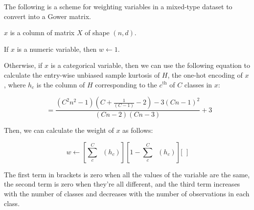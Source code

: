 \documentclass[11pt]{article}
\DeclareMathOperator{\Var}{\widehat{Var}}
\DeclareMathOperator{\Kurt}{\widehat{Kurtosis}}
\begin{document}
    The following is a scheme for weighting variables in a mixed-type dataset to convert into a Gower
    matrix.

    $x$ is a column of matrix $X$ of shape $\left(n,d\right)$.

    If $x$ is a numeric variable, then $w\leftarrow1$.

    Otherwise, if $x$ is a categorical variable, then we can use the following equation to calculate the entry-wise
    unbiased sample kurtosis of $H$, the one-hot encoding of $x$, where $h_c$ is the column of $H$ corresponding to the
    $c^{\text{th}}$ of $C$ classes in $x$:

    \begin{equation}
        \Kurt=\frac{(C^2n^2-1)(C+\frac{1}{(C-1)}-2)-3(Cn-1)^2}{(Cn-2)(Cn-3)}+3 \label{eq:kurtosis}
    \end{equation}

    Then, we can calculate the weight of $x$ as follows:

    \begin{equation}
        w\leftarrow
        \left[\sum_c^C{\Var(h_c)}\right]
        \left[1-\sum_c^C{\Var(h_c)}\right]
        \Biggl[\Kurt\Biggr]
        \label{eq:equation}
    \end{equation}



    The first term in brackets is zero when all the values of the variable are the same, the second term is zero when
    they're all different, and the third term increases with the number of classes and decreases with the number of
    observations in each class.
\end{document}
